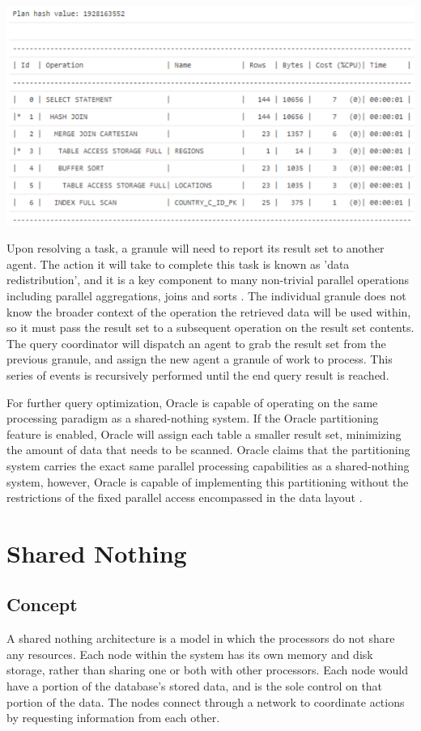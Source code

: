 \documentclass[onecolumn, draftclsnofoot,10pt, compsoc]{IEEEtran}
\begin{document}
\includegraphics{nickImage}

\indent Upon resolving a task, a granule will need to report its result set to another agent. 
The action it will take to complete this task is known as 'data redistribution', and it is a key component to many non-trivial parallel operations including parallel aggregations, joins and sorts \cite{OraclePEwODF}.
The individual granule does not know the broader context of the operation the retrieved data will be used within, so it must pass the result set to a subsequent operation on the result set contents.
The query coordinator will dispatch an agent to grab the result set from the previous granule, and assign the new agent a granule of work to process.
This series of events is recursively performed until the end query result is reached.

\indent For further query optimization, Oracle is capable of operating on the same processing paradigm as a shared-nothing system.
If the Oracle partitioning feature is enabled, Oracle will assign each table a smaller result set, minimizing the amount of data that needs to be scanned. 
Oracle claims that the partitioning system carries the exact same parallel processing capabilities as a shared-nothing system, however, Oracle is capable of implementing this partitioning without the restrictions of the fixed parallel access encompassed in the data layout \cite{OraclePEwODF}.  

	\section{Shared Nothing}
    \subsection{Concept}
A shared nothing architecture is a model in which the processors do not share any resources. 
Each node within the system has its own memory and disk storage, rather than sharing one or both with other processors.
Each node would have a portion of the database’s stored data, and is the sole control on that portion of the data. 
The nodes connect through a network to coordinate actions by requesting information from each other. 
\end{document}
